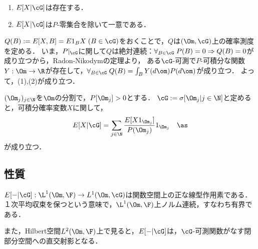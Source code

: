 \documentclass[uplatex,dvipdfmx]{jsreport}
\begin{document}
\begin{lemma}\mbox{}
    \begin{enumerate}
        \item $E[X|\cG]$は存在する．
        \item $E[X|\cG]$は$P$-零集合を除いて一意である．
    \end{enumerate}
\end{lemma}
\begin{Proof}
    $Q(B):=E[X,B]=E{1_BX}\;(B\in\cG)$をおくことで，$Q$は$(\Om,\cG)$上の確率測度を定める．
    いま，$P|_\cG$に関して$Q$は絶対連続：$\forall_{B\in\cG}\;P(B)=0\Rightarrow Q(B)=0$が成り立つから，Radon-Nikodymの定理より，
    ある$\cG$-可測で$P$-可積分な関数$Y:\Om\to\R$が存在して，$\forall_{B\in\cG}\;Q(B)=\int_BY(d\om)P(d\om)$が成り立つ．
    よって，(1),(2)が成り立つ．
\end{Proof}

\begin{example}[条件付き確率]
    $(\Om_j)_{j\in\N}$を$\Om$の分割で，$P[\Om_j]>0$とする．
    $\cG:=\sigma[\Om_j|j\in\N]$と定めると，可積分確率変数$X$に関して，
    \[E[X|\cG]=\sum_{j\in\N}\frac{E[X1_{\Om_j}]}{P(\Om_j)}1_{\Om_j}\quad\as\]
    が成り立つ．
\end{example}

\subsection{性質}

\begin{tcolorbox}[colframe=ForestGreen, colback=ForestGreen!10!white,breakable,colbacktitle=ForestGreen!40!white,coltitle=black,fonttitle=\bfseries\sffamily,
title=]
    $E[-|\cG]:\L^1(\Om,\F)\to L^1(\Om,\cG)$は関数空間上の正な線型作用素である．
    １次平均収束を保つという意味で，$\L^1(\Om,\F)$上ノルム連続，すなわち有界である．

    また，Hilbert空間$L^2(\Om,\F)$上で見ると，$E[-|\cG]$は，$\cG$-可測関数がなす閉部分空間への直交射影となる．
\end{tcolorbox}
\end{document}
